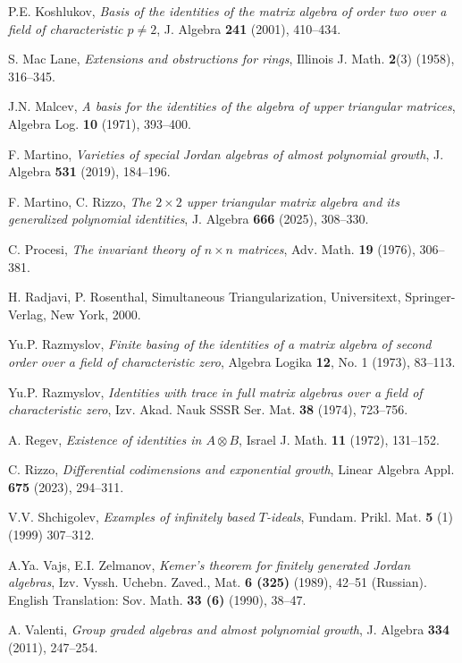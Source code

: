 \documentclass[reqno]{amsart}
\theoremstyle{definition}
\numberwithin{equation}{section}
\numberwithin{theorem}{section}
\begin{document}
\begin{thebibliography}{}
 P.E. Koshlukov, {\em Basis of the identities of the matrix algebra of order two over a field of characteristic $p\neq 2$}, J. Algebra \textbf{241} (2001), 410--434.

 S. Mac Lane, {\em Extensions and obstructions for rings}, Illinois J. Math. {\bf 2}(3) (1958), 316--345.

 J.N. Malcev, {\em A basis for the identities of the algebra of upper triangular matrices}, Algebra Log. \textbf{10} (1971), 393--400.

 F. Martino, {\em Varieties of special Jordan algebras of almost polynomial growth}, J. Algebra {\bf 531} (2019), 184--196.

 F. Martino, C. Rizzo, {\em The $2 \times 2$ upper triangular matrix algebra and its generalized polynomial identities}, J. Algebra \textbf{666} (2025), 308--330.

 C. Procesi, {\em The invariant theory of $n\times n$ matrices}, Adv. Math. \textbf{19} (1976), 306--381.

 H. Radjavi, P. Rosenthal, Simultaneous Triangularization, Universitext, Springer-Verlag, New York, 2000.

 Yu.P. Razmyslov, {\em Finite basing of the identities of a matrix algebra of second order over a field of characteristic zero}, Algebra Logika \textbf{12}, No. 1 (1973), 83--113.

 Yu.P. Razmyslov, {\em Identities with trace in full matrix algebras over a field of characteristic zero}, Izv. Akad. Nauk SSSR Ser. Mat. \textbf{38} (1974), 723--756.

 A. Regev, {\em Existence of identities in $A\otimes B$}, Israel J. Math. {\bf 11} (1972), 131--152.

 C. Rizzo, {\em Differential codimensions and exponential growth}, Linear Algebra Appl. {\bf 675} (2023), 294--311.

 V.V. Shchigolev, {\em Examples of infinitely based $T$-ideals}, Fundam. Prikl. Mat. \textbf{5} (1) (1999) 307--312.

 A.Ya. Vajs, E.I. Zelmanov, \textit{Kemer's theorem for finitely generated Jordan algebras}, Izv. Vyssh. Uchebn. Zaved., Mat. \textbf{6 (325)} (1989), 42--51 (Russian). English Translation: Sov. Math. \textbf{33 (6)} (1990), 38--47.

 A. Valenti, {\em Group graded algebras and almost polynomial growth}, J. Algebra {\bf 334} (2011), 247--254. 


\end{thebibliography}
\end{document}
